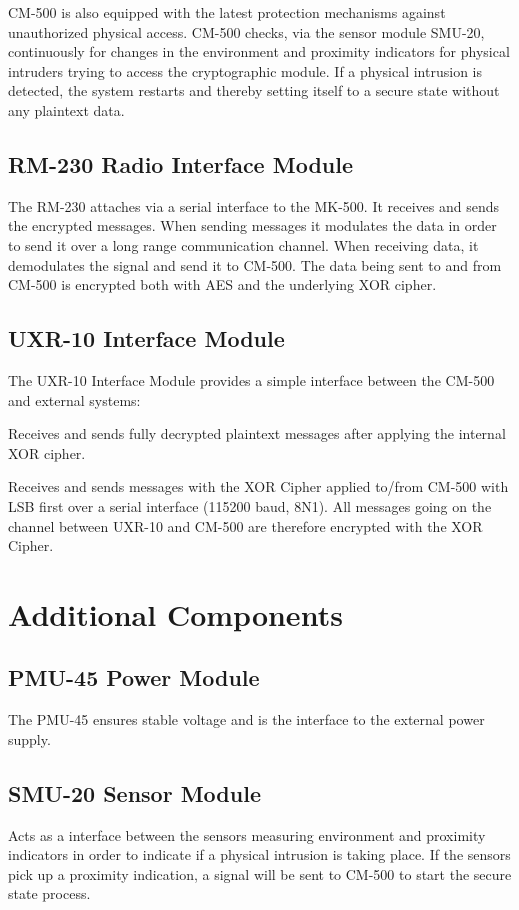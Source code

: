 \documentclass[11pt,a4paper,twocolumn]{article}
\begin{document}
CM-500 is also equipped with the latest protection mechanisms against unauthorized physical access. CM-500 checks, via the sensor module SMU-20, continuously for changes in the environment and proximity indicators for physical intruders trying to access the cryptographic module. If a physical intrusion is detected, the system restarts and thereby setting itself to a secure state without any plaintext data.  

\subsection{RM-230 Radio Interface Module} 
The RM-230 attaches via a serial interface to the MK-500. It receives and sends the encrypted messages. When sending messages it modulates the data in order to send it over a long range communication channel. When receiving data, it demodulates the signal and send it to CM-500. The data being sent to and from CM-500 is encrypted both with AES and the underlying XOR cipher.  

\subsection{UXR-10 Interface Module} The UXR-10 Interface Module provides a simple interface between the CM-500 and external systems:

\begin{compactitem}
\item Receives and sends fully decrypted plaintext messages after applying the internal XOR cipher.
\item Receives and sends messages with the XOR Cipher applied to/from CM-500 with LSB first over a serial interface (115200 baud, 8N1). All messages going on the channel between UXR-10 and CM-500 are therefore encrypted with the XOR Cipher. 
\end{compactitem}

\section{Additional Components}
\subsection{PMU-45 Power Module} The PMU-45 ensures stable voltage and is the interface to the external power supply. 
\subsection{SMU-20 Sensor Module} Acts as a interface between the sensors measuring environment and proximity indicators in order to indicate if a physical intrusion is taking place. If the sensors pick up a proximity indication, a signal will be sent to CM-500 to start the secure state process. 
\end{document}
